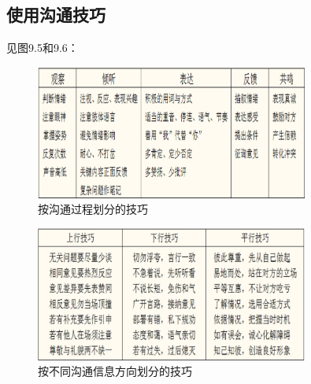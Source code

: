 \subsection{使用沟通技巧}
见图9.5和9.6：
\begin{figure}[!h]
	\centering
	\includegraphics[width=0.8\textwidth]{image/9-5}
	\caption{按沟通过程划分的技巧}
\end{figure}
\begin{figure}[!h]
	\centering
	\includegraphics[width=0.8\textwidth]{image/9-6}
	\caption{按不同沟通信息方向划分的技巧}
\end{figure}
